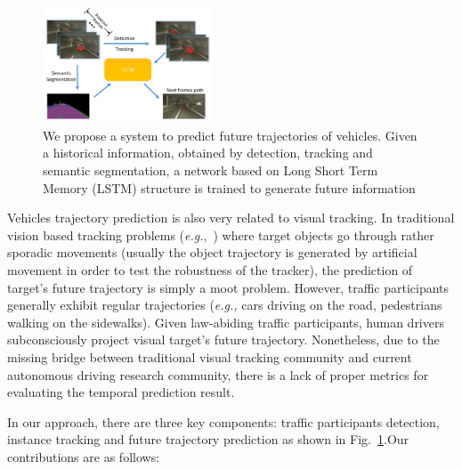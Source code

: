 \documentclass[10pt,twocolumn,letterpaper]{article}
\begin{document}
\begin{figure}[t]
        \centering
        \includegraphics[width=0.45\textwidth]{figures/pull_figure.pdf}
        \caption{ {\small We propose a system to predict future trajectories of vehicles. Given a historical information, obtained by detection, tracking and semantic segmentation, a network based on Long Short Term Memory (LSTM) structure is trained to generate future information}}
        \label{fig:pull_figure}
\end{figure}

Vehicles trajectory prediction is also very related to visual tracking.
In traditional vision based tracking problems (\emph{e.g.},~\cite{wu2013online, wu2015object, mueller2016benchmark}) where target objects go through rather sporadic movements (usually the object trajectory is generated by artificial movement in order to test the robustness of the tracker), the prediction of target's future trajectory is simply a moot problem.
However, traffic participants generally exhibit regular trajectories (\emph{e.g.,} cars driving on the road, pedestrians walking on the sidewalks). Given law-abiding traffic participants, human drivers subconsciously project visual target's future trajectory.
Nonetheless, due to the missing bridge between traditional visual tracking community and current autonomous driving research community, there is a lack of proper metrics for evaluating the temporal prediction result.



In our approach, there are three key components: traffic participants detection, instance tracking and future trajectory prediction as shown in Fig.~\ref{fig:pull_figure}.Our contributions are as follows:
\end{document}
